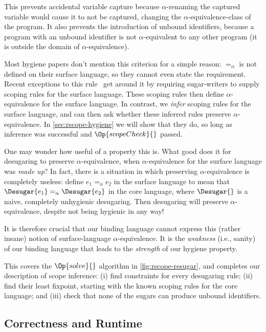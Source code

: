 This prevents accidental variable capture because $\alpha$-renaming
the captured variable would cause it to not be captured, changing the
$\alpha$-equivalence-class of the program. It also prevents the
introduction of unbound identifiers, because a program with an unbound
identifier is not $\alpha$-equivalent to any other program (it is
outside the domain of $\alpha$-equivalence).

Most hygiene papers don't mention this criterion for a simple reason:
$=_\alpha$ is not defined on their surface language, so they cannot even
state the requirement. Recent exceptions to this
rule~\cite{herman-hygiene,stansifer-romeo}
get around it by requiring sugar-writers to supply scoping rules
for the surface language. These scoping rules then define
$\alpha$-equivalence for the surface language.
In contrast, we \emph{infer} scoping rules for the surface language,
and can then ask whether these inferred rules preserve
$\alpha$-equivalence. In \cref{sec:rscope-hygiene} we will show that they do,
so long as inference was successful and $\Op{scopeCheck}{}$ passed.

One may wonder how useful of a property this is. What good does it for
desugaring to preserve $\alpha$-equivalence, when $\alpha$-equivalence
for the surface language was \emph{made up}?  In fact, there is a
situation in which preserving $\alpha$-equivalence is completely
useless: define $e_1 =_\alpha e_2$ in the surface language to mean
that $\Desugar{e_1} =_\alpha \Desugar{e_2}$ in the core language,
where $\Desugar{}$ is a naive, completely unhygienic desugaring. Then
desugaring will preserve $\alpha$-equivalence, despite not being
hygienic in any way!

It is therefore crucial that our binding language cannot express this
(rather insane) notion of surface-language $\alpha$-equivalence. It
is the \emph{weakness} (i.e., sanity) of our binding language that
leads to the \emph{strength} of our hygiene property.

This covers the $\Op{solve}{}$ algorithm in \cref{fig:rscope-resugar}, and
completes our description of scope inference: (i) find constraints for
every desugaring rule; (ii) find their least fixpoint, starting
with the known scoping rules for the core language; and (iii) check
that none of the sugars can produce unbound identifiers.


\subsection{Correctness and Runtime}

